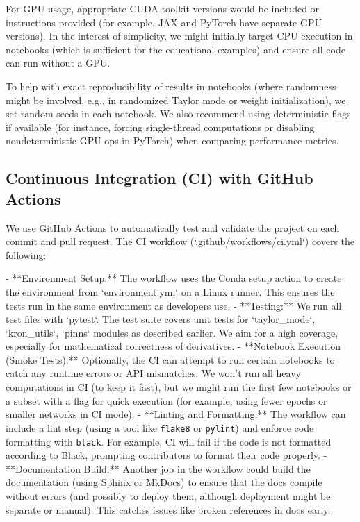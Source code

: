 \documentclass[11pt]{article}
\begin{document}
For GPU usage, appropriate CUDA toolkit versions would be included or instructions provided (for example, JAX and PyTorch have separate GPU versions). In the interest of simplicity, we might initially target CPU execution in notebooks (which is sufficient for the educational examples) and ensure all code can run without a GPU.

To help with exact reproducibility of results in notebooks (where randomness might be involved, e.g., in randomized Taylor mode or weight initialization), we set random seeds in each notebook. We also recommend using deterministic flags if available (for instance, forcing single-thread computations or disabling nondeterministic GPU ops in PyTorch) when comparing performance metrics.

\subsection{Continuous Integration (CI) with GitHub Actions}

We use GitHub Actions to automatically test and validate the project on each commit and pull request. The CI workflow (`.github/workflows/ci.yml`) covers the following:

- **Environment Setup:** The workflow uses the Conda setup action to create the environment from `environment.yml` on a Linux runner. This ensures the tests run in the same environment as developers use.
- **Testing:** We run all test files with `pytest`. The test suite covers unit tests for `taylor_mode`, `kron_utils`, `pinns` modules as described earlier. We aim for a high coverage, especially for mathematical correctness of derivatives.
- **Notebook Execution (Smoke Tests):** Optionally, the CI can attempt to run certain notebooks to catch any runtime errors or API mismatches. We won't run all heavy computations in CI (to keep it fast), but we might run the first few notebooks or a subset with a flag for quick execution (for example, using fewer epochs or smaller networks in CI mode).
- **Linting and Formatting:** The workflow can include a lint step (using a tool like \texttt{flake8} or \texttt{pylint}) and enforce code formatting with \texttt{black}. For example, CI will fail if the code is not formatted according to Black, prompting contributors to format their code properly.
- **Documentation Build:** Another job in the workflow could build the documentation (using Sphinx or MkDocs) to ensure that the docs compile without errors (and possibly to deploy them, although deployment might be separate or manual). This catches issues like broken references in docs early.
\end{document}
